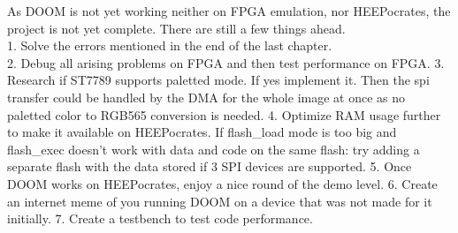 As DOOM is not yet working neither on FPGA emulation, nor HEEPocrates, the project is not yet complete. There are still a few things ahead. \\

1. Solve the errors mentioned in the end of the last chapter. \\
2. Debug all arising problems on FPGA and then test performance on FPGA.
3. Research if ST7789 supports paletted mode. If yes implement it. Then the spi transfer could be handled by the DMA for the whole image at once as no paletted color to RGB565 conversion is needed.
4. Optimize RAM usage further to make it available on HEEPocrates. If flash\_load mode is too big and flash\_exec doesn't work with data and code on the same flash: try adding a separate flash with the data stored if 3 SPI devices are supported.
5. Once DOOM works on HEEPocrates, enjoy a nice round of the demo level.
6. Create an internet meme of you running DOOM on a device that was not made for it initially.
7. Create a testbench to test code performance.